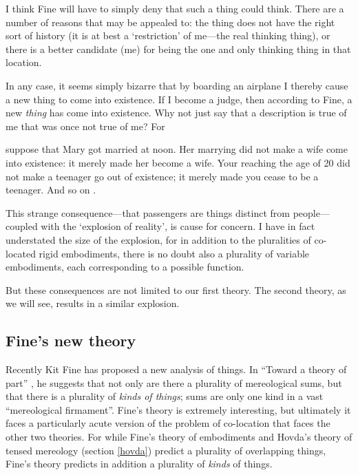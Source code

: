\documentclass[11pt]{article}
\newenvironment{squote}{%
\begin{spacing}{1}
\begin{list}{}{%
\setlength{\labelwidth}{0pt}%
\rightmargin\leftmargin%
}
\item\relax
}{%
\end{list}%
\end{spacing}
}
\begin{document}
\begin{spacing}{1.5}
I think Fine will have to simply deny that such a thing could think.
There are a number of reasons that may be appealed to: the thing does
not have the right sort of history (it is at best a `restriction' of
me---the real thinking thing), or there is a better candidate (me) for
being the one and only thinking thing in that location.

In any case, it seems simply bizarre that by boarding an airplane I
thereby cause a new thing to come into existence.  If I become a
judge, then according to Fine, a new {\em thing} has come into
existence.  Why not just say that a description is true of me that was
once not true of me?  For

\begin{squote}
suppose that Mary got married at noon.  Her marrying did not make a
wife come into existence: it merely made her become a wife.  Your
reaching the age of 20 did not make a teenager go out of existence; it
merely made you cease to be a teenager.  And so on
\citep[151]{thomson1998a}.
\end{squote}

This strange consequence---that passengers are things distinct from
people---coupled with the `explosion of reality', is cause for
concern.  I have in fact understated the size of the explosion, for in
addition to the pluralities of co-located rigid embodiments, there is
no doubt also a plurality of variable embodiments, each corresponding
to a possible function.

But these consequences are not limited to our first theory.  The
second theory, as we will see, results in a similar explosion.

\subsection{Fine's new theory}
\label{new-old}
Recently Kit Fine has proposed a new analysis of things.  In ``Toward
a theory of part'' \citeyearpar{fine2010}, he suggests that not only
are there a plurality of mereological sums, but that there is a
plurality of {\em kinds of things}; sums are only one kind in a vast
``mereological firmament''.  Fine's theory is extremely interesting,
but ultimately it faces a particularly acute version of the problem of
co-location that faces the other two theories.  For while Fine's
theory of embodiments and Hovda's theory of tensed mereology (section
\ref{hovda}) predict a plurality of overlapping things, Fine's theory
predicts in addition a plurality of {\em kinds} of things.


\end{spacing}
\end{document}
